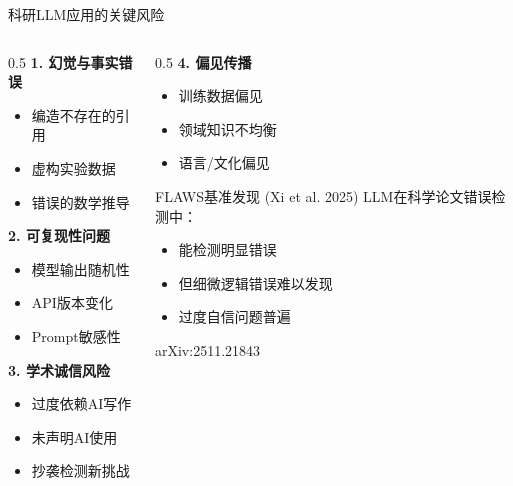 \documentclass[aspectratio=169,11pt]{beamer}
\begin{document}
\begin{frame}{科研LLM应用的关键风险}
    \begin{columns}
        \begin{column}{0.5\textwidth}
            \textbf{1. 幻觉与事实错误}
            \begin{itemize}
                \item 编造不存在的引用
                \item 虚构实验数据
                \item 错误的数学推导
            \end{itemize}
            
            \vspace{0.3cm}
            \textbf{2. 可复现性问题}
            \begin{itemize}
                \item 模型输出随机性
                \item API版本变化
                \item Prompt敏感性
            \end{itemize}
            
            \vspace{0.3cm}
            \textbf{3. 学术诚信风险}
            \begin{itemize}
                \item 过度依赖AI写作
                \item 未声明AI使用
                \item 抄袭检测新挑战
            \end{itemize}
        \end{column}
        \begin{column}{0.5\textwidth}
            \textbf{4. 偏见传播}
            \begin{itemize}
                \item 训练数据偏见
                \item 领域知识不均衡
                \item 语言/文化偏见
            \end{itemize}
            
            \vspace{0.3cm}
            \begin{alertblock}{FLAWS基准发现 (Xi et al. 2025)}
                \small
                LLM在科学论文错误检测中：
                \begin{itemize}
                    \item 能检测明显错误
                    \item 但细微逻辑错误难以发现
                    \item 过度自信问题普遍
                \end{itemize}
            \end{alertblock}
            
            {\scriptsize arXiv:2511.21843}
        \end{column}
    \end{columns}
\end{frame}
\end{document}
